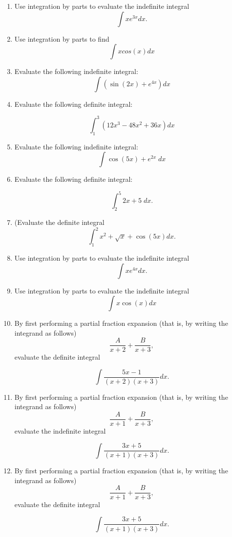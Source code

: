 \documentclass[a4paper,12pt]{article}
\begin{document}
\begin{enumerate}
	\item  Use integration by parts to evaluate the indefinite integral
	\[ \int  xe^{3x} dx. \]
	\item Use integration by parts to find \[ \int x cos(x) dx \]

\item Evaluate the following indefinite integral:
\[ \int (\sin(2x)+e^{4x}) dx   \]
\item Evaluate the following definite integral:

\[  \int^3_1 (12x^3 -48x^2 +36x) dx \]

	
	\item  Evaluate the following indefinite integral:
	\[ \int \cos(5x)+e^{2x}\; dx   \]


	\item Evaluate the following definite integral:
	
	\[  \int^{5}_{2}  2x+5\; dx.  \]
	


	\item (Evaluate the definite integral
	\[ \int^2_1 x^2 + \sqrt{x} + \cos(5x) dx. \]

	\item Use integration by parts to evaluate the indefinite integral
	\[ \int  xe^{4x} dx. \]
	\item  Use integration by parts to evaluate the indefinite integral
	\[\int x \cos(x) dx\]
	\item  By first performing a partial fraction expansion (that is, by writing the integrand
	as follows)
	\[  \frac{A}{x + 2} + \frac{B}{x + 3},
	\]evaluate the definite integral

	\[ \int \frac{5x-1}{(x + 2)(x + 3)}  dx. \]
	\item By first performing a partial fraction expansion (that is, by writing the integrand
	as follows)
	\[  \frac{A}{x + 1} + \frac{B}{x + 3},
	\]evaluate the indefinite integral

	\[ \int \frac{3x + 5}{(x + 1)(x + 3)}  dx. \]	%
	\item  By first performing a partial fraction expansion (that is, by writing the integrand
	as follows)
	\[  \frac{A}{x + 1} + \frac{B}{x + 3},
	\]evaluate the definite integral
	
	\[ \int \frac{3x + 5}{(x + 1)(x + 3)}  dx. \]

\end{enumerate}
\end{document}
